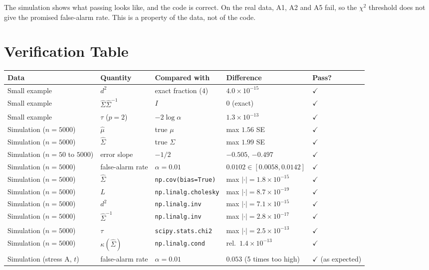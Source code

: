 \documentclass[11pt]{article}
\newcommand{\hSigma}{\hat{\Sigma}}
\newcommand{\hmu}{\hat{\mu}}
\newcommand{\code}[1]{\texttt{#1}}
\theoremstyle{plain}
\begin{document}
The simulation shows what passing looks like, and the code is correct. On the real
data, A1, A2 and A5 fail, so the $\chi^2$ threshold does not give the promised
false-alarm rate. This is a property of the data, not of the code.

\section{Verification Table}
\begin{table}[H]
\centering\small
\begin{tabular}{@{}lllll@{}}
\toprule
Data & Quantity & Compared with & Difference & Pass?\\
\midrule
Small example & $d^2$ & exact fraction ($4$) & $4.0\times10^{-15}$ & $\checkmark$\\
Small example & $\hSigma\hSigma^{-1}$ & $I$ & $0$ (exact) & $\checkmark$\\
Small example & $\tau$ ($p=2$) & $-2\log\alpha$ & $1.3\times10^{-13}$ & $\checkmark$\\
Simulation ($n=5000$) & $\hmu$ & true $\mu$ & max $1.56$ SE & $\checkmark$\\
Simulation ($n=5000$) & $\hSigma$ & true $\Sigma$ & max $1.99$ SE & $\checkmark$\\
Simulation ($n=50$ to $5000$) & error slope & $-1/2$ & $-0.505$, $-0.497$ & $\checkmark$\\
Simulation ($n=5000$) & false-alarm rate & $\alpha=0.01$ & $0.0102\in[0.0058,0.0142]$ & $\checkmark$\\
Simulation ($n=5000$) & $\hSigma$ & \code{np.cov(bias=True)} & max $|\cdot|=1.8\times10^{-15}$ & $\checkmark$\\
Simulation ($n=5000$) & $L$ & \code{np.linalg.cholesky} & max $|\cdot|=8.7\times10^{-19}$ & $\checkmark$\\
Simulation ($n=5000$) & $d^2$ & \code{np.linalg.inv} & max $|\cdot|=7.1\times10^{-15}$ & $\checkmark$\\
Simulation ($n=5000$) & $\hSigma^{-1}$ & \code{np.linalg.inv} & max $|\cdot|=2.8\times10^{-17}$ & $\checkmark$\\
Simulation ($n=5000$) & $\tau$ & \code{scipy.stats.chi2} & max $|\cdot|=2.5\times10^{-13}$ & $\checkmark$\\
Simulation ($n=5000$) & $\kappa(\hSigma)$ & \code{np.linalg.cond} & rel.\ $1.4\times10^{-13}$ & $\checkmark$\\
Simulation (stress A, $t$) & false-alarm rate & $\alpha=0.01$ & $0.053$ (5 times too high) & $\checkmark$ (as expected)\\

\end{tabular}
\end{table}
\end{document}
